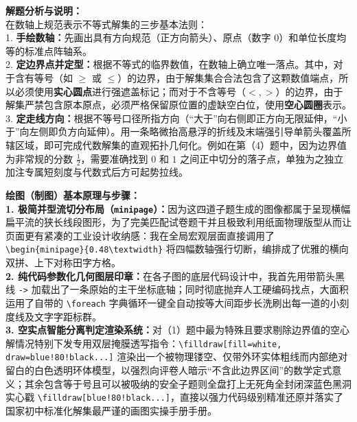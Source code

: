 \documentclass[12pt, a4paper]{ctexrep}
\begin{document}
{\small\color{gray}
\textbf{解题分析与说明：}\\
在数轴上规范表示不等式解集的三步基本法则：\\
1. \textbf{手绘数轴：}先画出具有方向规范（正方向箭头）、原点（数字 $0$）和单位长度均等的标准点阵轴系。\\
2. \textbf{定边界点并定型：}根据不等式的临界数值，在数轴上确立唯一落点。其中，对于含有等号（如 $\geqslant$ 或 $\leqslant$）的边界，由于解集集合合法包含了这颗数值端点，所以必须使用\textbf{实心圆点}进行强遮盖标记；而对于不含等号（$<, >$）的边界，由于解集严禁包含原本原点，必须严格保留原位置的虚缺空白位，使用\textbf{空心圆圈}表示。\\
3. \textbf{定走线方向：}根据不等号口径所指方向（“大于”向右侧即正方向无限延伸，“小于”向左侧即负方向延伸）。用一条略微抬高悬浮的折线及末端强引导单箭头覆盖所辖区域，即可完成代数解集的直观拓扑几何化。例如在第（4）题中，因为边界值为非常规的分数 $\frac{1}{2}$，需要准确找到 $0$ 和 $1$ 之间正中切分的落子点，单独为之独立加注专属短刻度与代数式后方可起势拉线。
}

\vspace{0.6cm}

{\small\color{blue!70!black}
\textbf{绘图（制图）基本原理与步骤：}\\
\textbf{1. 极简并型流切分布局（\texttt{minipage}）：}因为这四道子题生成的图像都属于呈现横幅扁平流的狭长线段图形，为了完美匹配试卷题干并且极致利用纸面物理版型从而让页面更有紧凑的工业设计收纳感：我在全局宏观层面直接调用了 \texttt{\textbackslash begin\{minipage\}\{0.48\textbackslash textwidth\}} 将四幅数轴强行切断，编排成了优雅的横向双拼、上下对称田字方格。\\
\textbf{2. 纯代码参数化几何图层印章：}在各子图的底层代码设计中，我首先用带箭头黑线 \texttt{->} 加载出了一条原始的主干坐标底轴；同时彻底抛弃人工硬编码找点，大面积运用了自带的 \texttt{\textbackslash foreach} 字典循环一键全自动按等大间距步长洗刷出每一道的小刻度线及文字字距标群。\\
\textbf{3. 空实点智能分离判定渲染系统：}对（1）题中最为特殊且要求剔除边界值的空心解情况特别下发专用双层掩膜透写指令：\texttt{\textbackslash filldraw[fill=white, draw=blue!80!black...]} 渲染出一个被物理镂空、仅带外环实体粗线而内部绝对留白的白色透明环体模型，以强烈向评卷人暗示“不含此边界区间”的数学定式意义；其余包含等于号且可以被吸纳的安全子题则全盘打上无死角全封闭深蓝色黑洞实心戳 \texttt{\textbackslash filldraw[blue!80!black...]}，直接以强力代码级别精准还原并落实了国家初中标准化解集最严谨的画图实操手册手册。
}

\newpage
\end{document}
